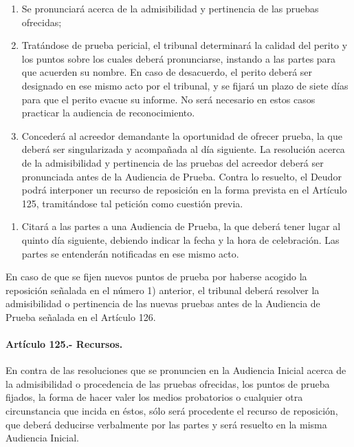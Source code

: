 \documentclass[
]{book}
\providecommand{\tightlist}{%
  \setlength{\itemsep}{0pt}\setlength{\parskip}{0pt}}
\begin{document}
\begin{enumerate}
\def\labelenumi{\alph{enumi})}
\item
  Se pronunciará acerca de la admisibilidad y pertinencia de las pruebas ofrecidas;
\item
  Tratándose de prueba pericial, el tribunal determinará la calidad del perito y los puntos sobre los cuales deberá pronunciarse, instando a las partes para que acuerden su nombre. En caso de desacuerdo, el perito deberá ser designado en ese mismo acto por el tribunal, y se fijará un plazo de siete días para que el perito evacue su informe. No será necesario en estos casos practicar la audiencia de reconocimiento.
\item
  Concederá al acreedor demandante la oportunidad de ofrecer prueba, la que deberá ser singularizada y acompañada al día siguiente. La resolución acerca de la admisibilidad y pertinencia de las pruebas del acreedor deberá ser pronunciada antes de la Audiencia de Prueba. Contra lo resuelto, el Deudor podrá interponer un recurso de reposición en la forma prevista en el Artículo 125, tramitándose tal petición como cuestión previa.
\end{enumerate}

\begin{enumerate}
\def\labelenumi{\arabic{enumi})}
\setcounter{enumi}{2}
\tightlist
\item
  Citará a las partes a una Audiencia de Prueba, la que deberá tener lugar al quinto día siguiente, debiendo indicar la fecha y la hora de celebración. Las partes se entenderán notificadas en ese mismo acto.
\end{enumerate}

En caso de que se fijen nuevos puntos de prueba por haberse acogido la reposición señalada en el número 1) anterior, el tribunal deberá resolver la admisibilidad o pertinencia de las nuevas pruebas antes de la Audiencia de Prueba señalada en el Artículo 126.

\hypertarget{artuxedculo-125.--recursos.}{%
\paragraph*{Artículo 125.- Recursos.}\label{artuxedculo-125.--recursos.}}

En contra de las resoluciones que se pronuncien en la Audiencia Inicial acerca de la admisibilidad o procedencia de las pruebas ofrecidas, los puntos de prueba fijados, la forma de hacer valer los medios probatorios o cualquier otra circunstancia que incida en éstos, sólo será procedente el recurso de reposición, que deberá deducirse verbalmente por las partes y será resuelto en la misma Audiencia Inicial.
\end{document}
